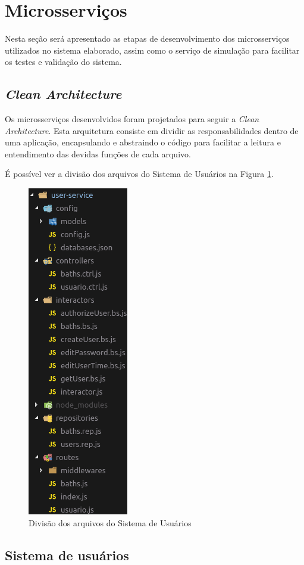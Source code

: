 \section{Microsserviços}

Nesta seção será apresentado as etapas de desenvolvimento dos microsserviços utilizados no sistema elaborado, assim como o serviço de simulação para facilitar os testes e validação do sistema.

\subsection{\textit{Clean Architecture}}

Os microsserviços desenvolvidos foram projetados para seguir a \textit{Clean Architecture}. Esta arquitetura consiste em dividir as responsabilidades dentro de uma aplicação, encapsulando e abstraindo o código para facilitar a leitura e entendimento das devidas funções de cada arquivo.

É possível ver a divisão dos arquivos do Sistema de Usuários na Figura \ref{fig:clean}.

\begin{figure}[htbp]
	\centering
	\includegraphics[width=0.25\linewidth]{figuras/cleanarch.png}
	\caption{Divisão dos arquivos do Sistema de Usuários}
	\label{fig:clean}
\end{figure}

\subsection{Sistema de usuários}

